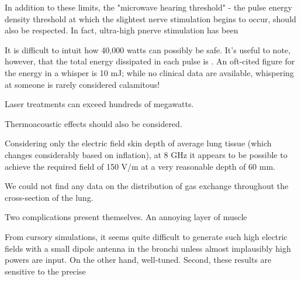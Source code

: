 \documentclass[paper.tex]{subfiles}
\begin{document}
In addition to these limits, the "microwave hearing threshold" - the pulse energy density threshold at which the slightest nerve stimulation begins to occur, should also be respected. In fact, ultra-high pnerve stimulation has been 

It is difficult to intuit how 40,000 watts can possibly be safe. It's useful to note, however, that the total energy dissipated in each pulse is . An oft-cited figure for the energy in a whisper is 10 mJ; while no clinical data are available, whispering at someone is rarely considered calamitous\citationneeded!
 

Laser treatments can exceed hundreds of megawatts.
 
 
 Thermoacoustic effects should also be considered.
 



Considering only the electric field skin depth\footnotemark\cite{Safety2001}\cite{Physical1982} of average lung tissue\cite{gabriel1996compilation}\cite{Dielectricb}\cite{Dielectric}\cite{Tissue2018} (which changes considerably based on inflation), at 8 GHz it appears to be possible to achieve the required field of 150 V/m at a very reasonable depth of 60 mm. 

We could not find any data on the distribution of gas exchange throughout the cross-section of the lung.

Two complications present themselves. An annoying layer of muscle 


From cursory simulations, it seems quite difficult to generate such high electric fields with a small dipole antenna in the bronchi unless almost implausibly high powers are input. On the other hand, well-tuned. Second, these results are sensitive to the precise

\end{document}
